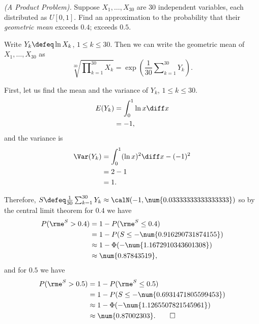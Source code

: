 \begin{problem}[Handout 14, \# 8]
  \emph{(A Product Problem).} Suppose \(X_1,\dotsc,X_{30}\) are \(30\)
  independent variables, each distributed as \(U[0,1]\). Find an
  approximation to the probability that their \emph{geometric mean} exceeds
  \(0.4\); exceeds \(0.5\).
\end{problem}
\begin{solution}
  Write \(Y_k\defeq \ln X_k\), \(1\leq k\leq 30\). Then we can write the
  geometric mean of \(X_1,\dotsc,X_{30}\) as
  \[
    \sqrt[30]{\prod\nolimits_{k=1}^{30} X_k}
    =\exp\left(\frac{1}{30}\sum\nolimits_{k=1}^{30} Y_k\right).
  \]

  First, let us find the mean and the variance of \(Y_k\), \(1\leq k\leq
  30\).
  \begin{align*}
    E(Y_k)
    &=\int_0^1 \ln x\diff x\\
    &=-1,
  \end{align*}
  and the variance is
  \begin{align*}
    \Var(Y_k)
    &=\int_0^1 (\ln x)^2\diff x-(-1)^2\\
    &=2-1\\
    &=1.
  \end{align*}

  Therefore,
  \(S\defeq \frac{1}{30}\sum_{k=1}^{30}Y_k\approx\calN(-1,\num{0.03333333333333333})\)
  so by the central limit theorem for \(0.4\) we have
  \begin{align*}
    P(\rme^S>0.4)
    &=1-P(\rme^{S}\leq 0.4)\\
    &=1-P(S\leq-\num{0.916290731874155})\\
    &\approx 1-\Phi(-\num{1.1672910343601308})\\
    &\approx\num{0.87843519},
  \end{align*}
  and for \(0.5\) we have
  \begin{align*}
    P(\rme^S>0.5)
    &=1-P(\rme^{S}\leq 0.5)\\
    &=1-P(S\leq-\num{0.6931471805599453})\\
    &\approx 1-\Phi(-\num{1.1265507821545961})\\
    &\approx\num{0.87002303}.\qedhere
  \end{align*}
\end{solution}
\newpage

